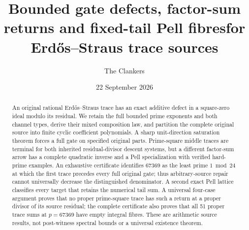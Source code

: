 \documentclass[11pt,reqno]{amsart}
\title[ES trace defects and Pell returns]{Bounded gate defects, factor-sum returns and fixed-tail Pell fibres\newline for Erd\H{o}s--Straus trace sources}
\author{The Clankers}
\date{22 September 2026}
\begin{document}
\begin{abstract}
An original rational Erd\H{o}s--Straus trace has an exact additive defect in a
square-zero ideal modulo its residual. We retain the full bounded prime
exponents and both channel types, derive their mixed composition law, and
partition the complete original source into finite cyclic coefficient
polynomials. A sharp unit-direction saturation theorem forces a full gate on
specified original parts. Prime-square middle traces are terminal for both
inherited residual-divisor descent systems, but a different factor-sum arrow
has a complete quadratic inverse and a Pell specialization with verified
hard-prime examples. An exhaustive certificate identifies $67369$ as the least
prime $1\bmod24$ at which the first trace precedes every full original gate;
thus arbitrary-source repair cannot universally decrease the distinguished
denominator. A second exact Pell lattice classifies every target that retains
the numerical tail sum. A universal four-case argument proves that no proper
prime-square trace has such a return at a proper divisor of its source
residual; the complete certificate also proves that all 51 proper trace sums
at $p=67369$ have empty integral fibres. These are arithmetic source results,
not post-witness spectral bounds or a universal existence theorem.
\end{abstract}
\maketitle


\end{document}
